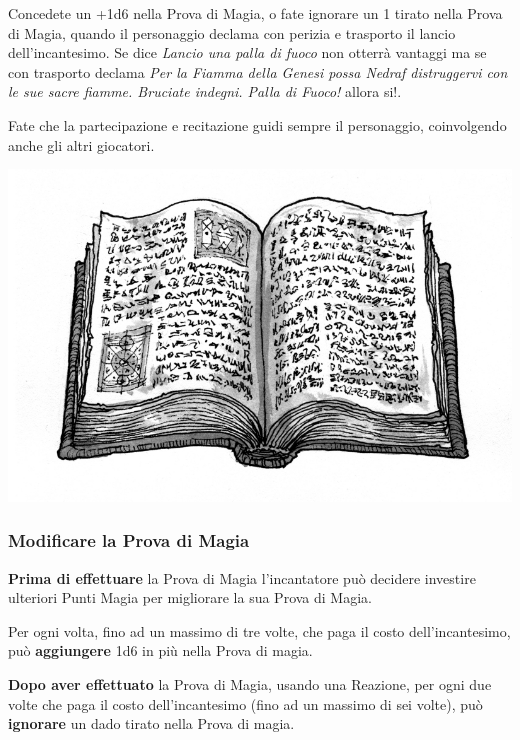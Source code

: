 \begin{multicols}{2}
\begin{changemargin}{0.3cm}{0.3cm}\begin{narratore}
Concedete un +1d6 nella Prova di Magia, o fate ignorare un 1 tirato nella Prova di Magia, quando il personaggio declama con perizia e trasporto il lancio dell'incantesimo. Se dice \emph{Lancio una palla di fuoco} non otterrà vantaggi ma se con trasporto declama \emph{Per la Fiamma della Genesi possa Nedraf distruggervi con le sue sacre fiamme. Bruciate indegni. Palla di Fuoco!} allora si!.

Fate che la partecipazione e recitazione guidi sempre il personaggio, coinvolgendo anche gli altri giocatori.
\end{narratore}\end{changemargin}

\begin{center}
	\includegraphics[width=1\linewidth]{immagini/spellbook.png}
\end{center}

\subsubsection{Modificare la Prova di Magia}

\textbf{Prima di effettuare} la Prova di Magia l'incantatore può decidere investire ulteriori Punti Magia per migliorare la sua Prova di Magia.

Per ogni volta, fino ad un massimo di tre volte, che paga il costo dell'incantesimo, può \textbf{aggiungere} 1d6 in più nella Prova di magia. 

\textbf{Dopo aver effettuato} la Prova di Magia, usando una Reazione, per ogni due volte che paga il costo dell'incantesimo (fino ad un massimo di sei volte), può \textbf{ignorare} un dado tirato nella Prova di magia. 


\end{multicols}
